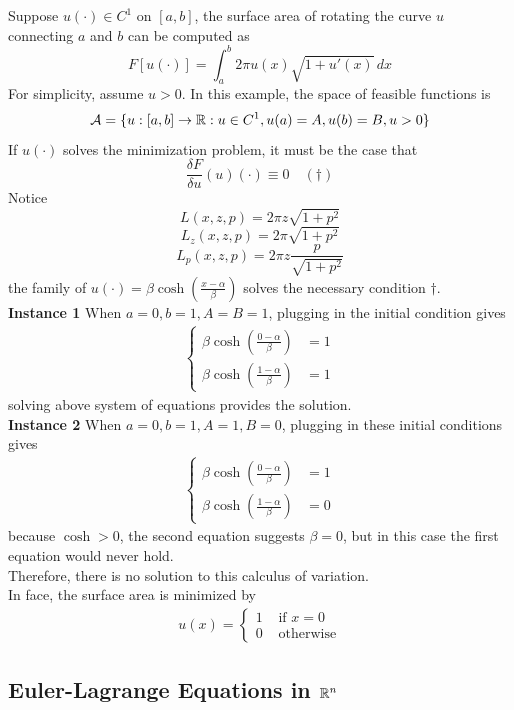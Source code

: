 \documentclass[11pt]{article}
\begin{document}
Suppose $u(\cdot) \in C^1$ on $[a,b]$, the surface area of rotating the curve $u$ connecting $a$ and $b$ can be computed as
$$F[u(\cdot)] = \int_a^b 2\pi u(x) \sqrt{1 + u'(x)} \, dx$$
For simplicity, assume $u > 0$. 
In this example, the space of feasible functions is
$$ \mathcal{A} = \{ u:[a,b] \rightarrow \mathbb{R}: u \in C^1, u(a) = A, u(b) = B, u > 0 \}$$
If $u(\cdot)$ solves the minimization problem, it must be the case that
$$\frac{\delta F}{\delta u}(u)(\cdot) \equiv 0 \quad (\dagger)$$
Notice
$$L(x,z,p) = 2\pi z \sqrt{1 + p^2}$$
$$L_z(x,z,p) = 2\pi \sqrt{1 + p^2}$$
$$L_p(x,z,p) = 2\pi z \frac{p}{\sqrt{1 + p^2}}$$
 the family of $u(\cdot) = \beta \cosh(\frac{x - \alpha}{\beta})$ solves the necessary condition $\dagger$. \\
\textbf{Instance 1} When $a=0, b=1, A=B=1$, plugging in the initial condition gives
		\begin{align}
			\begin{cases}
				\beta \cosh \left(\frac{0-\alpha}{\beta}\right) &= 1 \\
				\beta \cosh \left(\frac{1-\alpha}{\beta}\right) &= 1
			\end{cases}
		\end{align}
		solving above system of equations provides the solution. \\
		\textbf{Instance 2} When $a=0, b=1, A=1, B=0$, plugging in these initial conditions gives
		\begin{align}
			\begin{cases}
				\beta \cosh \left(\frac{0-\alpha}{\beta}\right) &= 1 \\
				\beta \cosh \left(\frac{1-\alpha}{\beta}\right) &= 0
			\end{cases}
		\end{align}
		because $\cosh > 0$, the second equation suggests $\beta=0$, but in this case the first equation would never hold. \\
		Therefore, there is no solution to this calculus of variation. \\
		In face, the surface area is minimized by
		\begin{align}
			u(x) = \begin{cases}
				1 &\text{ if } x = 0 \\
				0 &\text{ otherwise}
			\end{cases}
		\end{align}

\subsection{Euler-Lagrange Equations in $\mathbb{R}^n$}
\end{document}
